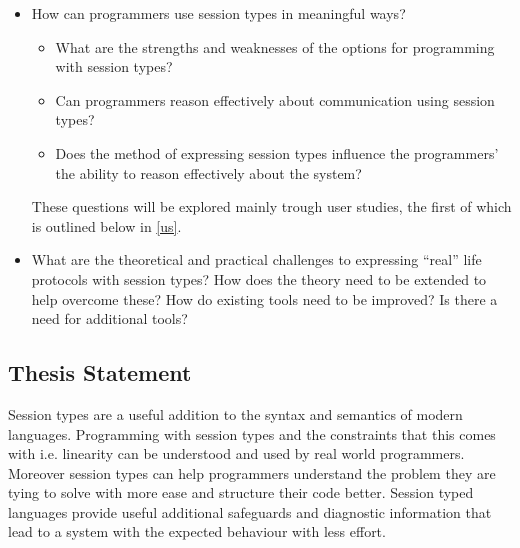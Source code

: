 \begin{itemize} 
\item How can programmers use session types in meaningful ways?
\begin{itemize}
\item What are the strengths and weaknesses of the options for programming with session types?
\item Can programmers reason effectively about communication using session types?
\item Does the method of expressing session types influence the programmers' the ability to reason effectively about the system?
\end{itemize}
These questions will be explored mainly trough user studies, the first of which is outlined below in \ref{us}.

\item What are the theoretical and practical challenges to expressing “real” life protocols with session types? 
How does the theory need to be extended to help overcome these? How do existing tools need to be improved? Is there a need for additional tools?
\end{itemize}
\subsection{Thesis Statement}

Session types are a useful addition to the syntax and semantics of modern languages. Programming with session types and the constraints that this comes with i.e. linearity can be understood and used by real world programmers. Moreover session types can help programmers understand the problem they are tying to solve with more ease and structure their code better.
Session typed languages provide useful additional safeguards and diagnostic information that lead to a system with the expected behaviour with less effort.
